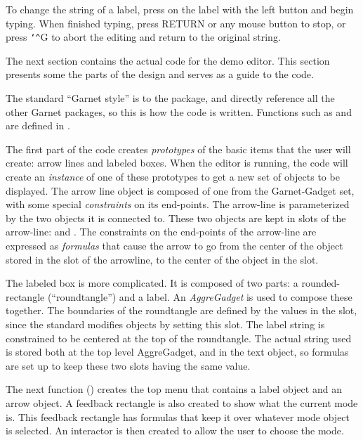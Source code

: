 To change the string of a label, press on the label with the left button
and begin typing.  When finished typing, press RETURN or any mouse button
to stop, or press {\tt\char`\^}G to abort the editing and return to the original string.


The next section contains the actual code for the demo editor.  This
section presents some the parts of the design and serves as a guide to the
code.

The standard ``Garnet style'' is to  the  package,
and directly reference all the other Garnet packages, so this is how the
code is written.  Functions such as  and  are defined in .

The first part of the code creates {\it prototypes} of the basic items that
the user will create: arrow lines and labeled boxes.  When the editor is
running, the code will create an {\it instance} of one of these
prototypes to get a new set of objects to be displayed.  The arrow line
object is composed of one  from the Garnet-Gadget set, with
some special {\it constraints} on its end-points.  The arrow-line is
parameterized by the two objects it is connected to.  These two objects are
kept in slots of the arrow-line:  and .
The constraints on the end-points of the arrow-line are
expressed as {\it formulas} that cause the arrow to go from the center of the
object stored in the  slot of the arrowline, to the center of
the object in the  slot.

The labeled box is more complicated.  It is composed of two parts: a
rounded-rectangle (``roundtangle'') and a label.  An {\it AggreGadget} is
used to compose these together.  The boundaries of the roundtangle are
defined by the values in the  slot, since the standard
 modifies objects by setting this slot.  The label
string is constrained to be centered at the top of the roundtangle.  The
actual string used is stored both at the top level AggreGadget, and in the
text object, so formulas are set up to keep these two  slots
having the same value.

The next function () creates the top menu that
contains a label object and an arrow object.  A feedback rectangle is also
created to show what the current mode is.  This feedback rectangle has
formulas that keep it over whatever mode object is selected.
An interactor is then created to allow the user to choose the mode.

